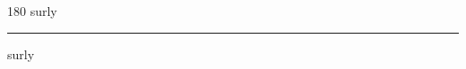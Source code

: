
\begin{frame}
\begin{center}
\begin{turn}{180}
{\fontsize{2.5cm}{1em}\selectfont surly}
\end{turn}
\vspace{1em}\par  
\hrule
\vspace{1em}\par  
{\fontsize{2.5cm}{1em}\selectfont surly}
\end{center}
\end{frame}
